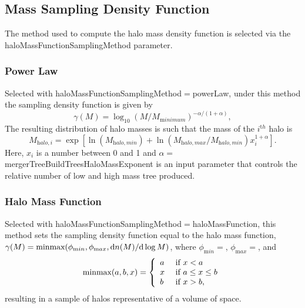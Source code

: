 \subsection{Mass Sampling Density Function}\label{sec:MassSamplingDensityFunction}

The method used to compute the halo mass density function is selected via the {\normalfont \ttfamily haloMassFunctionSamplingMethod} parameter.

\subsubsection{Power Law}

Selected with {\normalfont \ttfamily haloMassFunctionSamplingMethod}$=${\normalfont \ttfamily powerLaw}, under this method the sampling density function is given by
\begin{equation}
\gamma(M) = \log_{10}(M/M_{\mathrm minimum})^{-\alpha/(1+\alpha)},
\end{equation}
The resulting distribution of halo masses is such that the mass of the $i^{\mathrm th}$ halo is
\begin{equation}
 M_{\mathrm halo,i} = \exp\left[ \ln(M_{\mathrm halo,min}) + \ln\left({M_{\mathrm halo,max}/M_{\mathrm halo,min}}\right) x_i^{1+\alpha} \right].
\end{equation}
Here, $x_i$ is a number between 0 and 1 and $\alpha=${\normalfont \ttfamily mergerTreeBuildTreesHaloMassExponent} is an input parameter that controls the relative number of low and high mass tree produced.

\subsubsection{Halo Mass Function}

Selected with {\normalfont \ttfamily haloMassFunctionSamplingMethod}$=${\normalfont \ttfamily haloMassFunction}, this method sets the sampling density function equal to the halo mass function, $\gamma(M) = \hbox{minmax}(\phi_{\mathrm min},\phi_{\mathrm max},{\mathrm d} n(M)/{\mathrm d}\log M)$, where $\phi_{\mathrm min}=${\normalfont \ttfamily [haloMassFunctionSamplingAbundanceMinimum]}, $\phi_{\mathrm max}=${\normalfont \ttfamily [haloMassFunctionSamplingAbundanceMaximum]}, and
\begin{equation}
 \hbox{minmax}(a,b,x) = \left\{\begin{array}{ll}a & \hbox{ if } x < a \\ x & \hbox{ if } a \leq x \leq b\\ b & \hbox{ if } x > b,\end{array}\right.
\end{equation}
resulting in a sample of halos representative of a volume of space.

